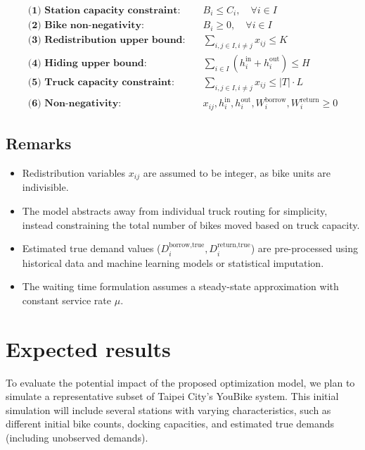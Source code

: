 \documentclass[11pt,a4paper]{article}
\begin{document}
\begin{align*}
\textbf{(1) Station capacity constraint:} & \quad B_i \leq C_i, \quad \forall i \in I \\
\textbf{(2) Bike non-negativity:} & \quad B_i \geq 0, \quad \forall i \in I \\
\textbf{(3) Redistribution upper bound:} & \quad \sum_{i,j \in I, i \ne j} x_{ij} \leq K \\
\textbf{(4) Hiding upper bound:} & \quad \sum_{i \in I} \left(h_i^{\text{in}} + h_i^{\text{out}}\right) \leq H \\
\textbf{(5) Truck capacity constraint:} & \quad \sum_{i,j \in I, i \ne j} x_{ij} \leq |T| \cdot L \\
\textbf{(6) Non-negativity:} & \quad x_{ij}, h_i^{\text{in}}, h_i^{\text{out}}, W_i^{\text{borrow}}, W_i^{\text{return}} \geq 0
\end{align*}

\subsection*{Remarks}

\begin{itemize}
    \item Redistribution variables $x_{ij}$ are assumed to be integer, as bike units are indivisible.
    \item The model abstracts away from individual truck routing for simplicity, instead constraining the total number of bikes moved based on truck capacity.
    \item Estimated true demand values ($D_i^{\text{borrow,true}}, D_i^{\text{return,true}}$) are pre-processed using historical data and machine learning models or statistical imputation.
    \item The waiting time formulation assumes a steady-state approximation with constant service rate $\mu$.
\end{itemize}




\section{Expected results}

To evaluate the potential impact of the proposed optimization model, we plan to simulate a representative subset of Taipei City’s YouBike system. This initial simulation will include several stations with varying characteristics, such as different initial bike counts, docking capacities, and estimated true demands (including unobserved demands).
\end{document}
